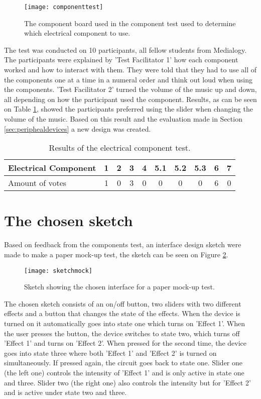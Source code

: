 \begin{figure}[!h] 
\centering
\texttt{[image: componenttest]}
\caption{\label{fig:componenttest} The component board used in the component test used to determine which electrical component to use.}
\end{figure}

The test was conducted on 10 participants, all fellow students from Medialogy. The participants were explained by 'Test Facilitator 1' how each component worked and how to interact with them. They were told that they had to use all of the components one at a time in a numeral order and think out loud when using the components. 'Test Facilitator 2' turned the volume of the music up and down, all depending on how the participant used the component.
Results, as can be seen on Table \ref{tab:electritest}, showed the participants preferred using the slider when changing the volume of the music. Based on this result and the evaluation made in Section \ref{sec:periphealdevices} a new design was created.

\begin{table}[!h]
\centering
\caption{Results of the electrical component test.}
\label{tab:electritest}
\begin{tabular}{|l|c|c|c|c|c|c|c|c|c|}
\hline
Electrical Component & 1 & 2 & 3 & 4 & 5.1 & 5.2 & 5.3 & 6 & 7 \\ \hline
Amount of votes & 1 & 0 & 3 & 0 & 0 & 0 & 0 & 6 & 0 \\ \hline
\end{tabular}
\end{table}


\section{The chosen sketch}\label{sec:thechosensketch}
Based on feedback from the components test, an interface design sketch were made to make a paper mock-up test, the sketch can be seen on Figure \ref{fig:sketchmock}. 

\begin{figure}[!h] 
\centering
\texttt{[image: sketchmock]}
\caption{\label{fig:sketchmock} Sketch showing the chosen interface for a paper mock-up test.}
\end{figure}

The chosen sketch consists of an on/off button, two sliders with two different effects and a button that changes the state of the effects. When the device is turned on it automatically goes into state one which turns on 'Effect 1'. When the user presses the button, the device switches to state two, which turns off 'Effect 1' and turns on 'Effect 2'. When pressed for the second time, the device goes into state three where both 'Effect 1' and 'Effect 2' is turned on simultaneously. If pressed again, the circuit goes back to state one. Slider one (the left one) controls the intensity of 'Effect 1' and is only active in state one and three. Slider two (the right one) also controls the intensity but for 'Effect 2' and is active under state two and three.

